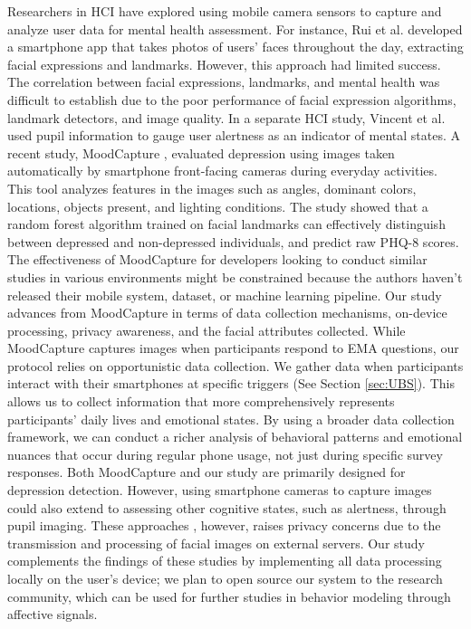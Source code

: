 Researchers in HCI have explored using mobile camera sensors to capture and analyze user data for mental health assessment. For instance, Rui et al. \cite{wang2015using} developed a smartphone app that takes photos of users' faces throughout the day, extracting facial expressions and landmarks. However, this approach had limited success. The correlation between facial expressions, landmarks, and mental health was difficult to establish due to the poor performance of facial expression algorithms, landmark detectors, and image quality. In a separate HCI study, Vincent et al. \cite{tseng2018alertnessscanner} used pupil information to gauge user alertness as an indicator of mental states. A recent study, MoodCapture \cite{nepal2024moodcapture}, evaluated depression using images taken automatically by smartphone front-facing cameras during everyday activities. This tool analyzes features in the images such as angles, dominant colors, locations, objects present, and lighting conditions. The study showed that a random forest algorithm trained on facial landmarks can effectively distinguish between depressed and non-depressed individuals, and predict raw PHQ-8 scores. The effectiveness of MoodCapture for developers looking to conduct similar studies in various environments might be constrained because the authors haven't released their mobile system, dataset, or machine learning pipeline. Our study advances from MoodCapture in terms of data collection mechanisms, on-device processing, privacy awareness, and the facial attributes collected. While MoodCapture captures images when participants respond to EMA questions, our protocol relies on opportunistic data collection. We gather data when participants interact with their smartphones at specific triggers (See Section \ref{sec:UBS}). This allows us to collect information that more comprehensively represents participants' daily lives and emotional states. By using a broader data collection framework, we can conduct a richer analysis of behavioral patterns and emotional nuances that occur during regular phone usage, not just during specific survey responses. Both MoodCapture and our study are primarily designed for depression detection. However, using smartphone cameras to capture images could also extend to assessing other cognitive states, such as alertness, through pupil imaging. These approaches \cite{tseng2018alertnessscanner, wang2015using, nepal2024moodcapture}, however, raises privacy concerns due to the transmission and processing of facial images on external servers. Our study complements the findings of these studies by implementing all data processing locally on the user's device; we plan to open source our system to the research community, which can be used for further studies in behavior modeling through affective signals.




